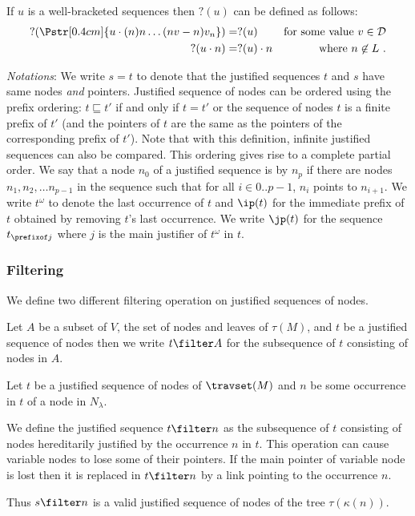 If $u$ is a well-bracketed sequences then $?(u)$ can be defined as follows:
\begin{align*}
  ?(\Pstr[0.4cm]{u \cdot (n){n} \ldots (nv-n){v_n} }  ) &= ?(u)
          & \mbox{for some value $v\in\mathcal{D}$}  \\
    ?(u \cdot n) &= ?(u)\cdot n    & \mbox{where $n\not\in L$} \ .
\end{align*}

\bigskip

\emph{Notations}: We write $s = t$ to denote that the justified sequences $t$ and $s$
have same nodes \emph{and} pointers. Justified sequence of nodes can
be ordered using the prefix ordering: $t \sqsubseteq t'$ if and only
if $t=t'$ or the sequence of nodes $t$ is a finite prefix of $t'$
(and the pointers of $t$ are the same as the pointers of the
corresponding prefix of $t'$). Note that with this definition,
infinite justified sequences can also be compared. This ordering
gives rise to a complete partial order.
We say that a node $n_0$ of a justified sequence is  by $n_p$ if there are nodes $n_1, n_2, \ldots n_{p-1}$ in the sequence such that for all $i\in 0..p-1$, $n_i$ points to $n_{i+1}$.
We write $t^\omega$ to denote the last occurrence of $t$ and $\ip(t)$ for the immediate prefix of $t$ obtained by removing $t$'s last occurrence. We write $\jp(t)$ for the sequence $t_{\prefixof j}$ where $j$ is
the main justifier of $t^\omega$ in $t$.
\smallskip

\subsubsection{Filtering}

We define two different filtering operation on justified sequences of nodes.

Let $A$ be a subset of $V$, the set of nodes and leaves of $\tau(M)$, and $t$ be a justified sequence of nodes then we write $t\filter A$ for the subsequence of $t$ consisting of nodes in $A$.

\begin{definition}
Let $t$ be a justified sequence of nodes of $\travset(M)$ and
$n$ be some occurrence in $t$ of a node in $N_\lambda$.

We define the justified sequence $t \filter n$ as the subsequence of $t$ consisting of nodes hereditarily justified by the occurrence $n$ in $t$.
This operation can cause variable nodes to lose some of their pointers. If the main pointer of variable node is
lost then it is replaced in $t\filter n$ by a link pointing to the occurrence $n$.
\end{definition}
Thus $s \filter n$ is a valid justified sequence of nodes of the tree $\tau(\kappa(n))$.

